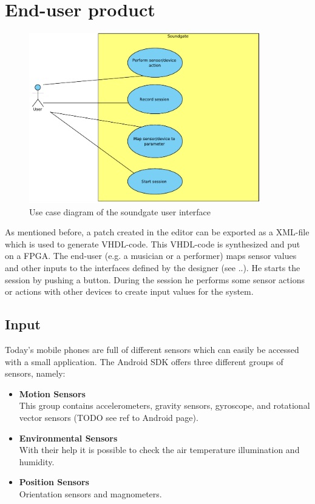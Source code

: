 \section{End-user product}

	\begin{figure}[!h]
		\centering
			\includegraphics[width=0.90\textwidth]{images/User_View.pdf}
		\caption{Use case diagram of the soundgate user interface}
		\label{fig:Soundgate_UserInterface}
	\end{figure}
	
	As mentioned before, a patch created in the editor can be exported as a XML-file which is used to generate VHDL-code. This VHDL-code is synthesized and put on a FPGA. The end-user (e.g. a musician or a performer) maps sensor values and other inputs to the interfaces defined by the designer (see ..). He starts the session by pushing a button. During the session he performs some sensor actions or actions with other devices to create input values for the system.
	
\subsection{Input}
Today's mobile phones are full of different sensors which can easily be accessed with a small application. The Android SDK offers three different groups of sensors, namely:
\begin{itemize}
	\item \textbf{Motion Sensors} \\
			This group contains accelerometers, gravity sensors, gyroscope, and rotational vector sensors (TODO see ref to Android page). 
	\item \textbf{Environmental Sensors} \\
			With their help it is possible to check the air temperature illumination and humidity.
	\item \textbf{Position Sensors} \\
			Orientation sensors and magnometers.
\end{itemize}

